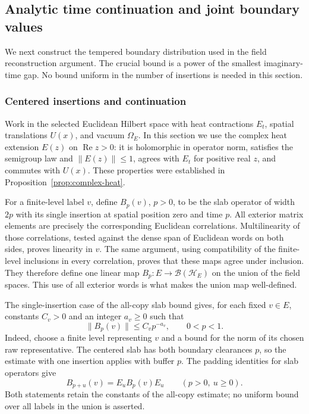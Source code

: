 \subsection{Analytic time continuation and joint boundary values}
\label{sec:analytic-boundary}
We next construct the tempered boundary distribution used in the field
reconstruction argument. The crucial bound is a power of the smallest imaginary-time
gap. No bound uniform in the number of insertions is needed in this section.

\subsubsection{Centered insertions and continuation}
Work in the selected Euclidean Hilbert space with heat contractions $E_t$,
spatial translations $U(x)$, and vacuum $\Omega_E$. In this section we use the
complex heat extension $E(z)$ on $\operatorname{Re}z>0$: it is holomorphic in
operator norm, satisfies the semigroup law and $\|E(z)\|\leq1$, agrees with
$E_t$ for positive real $z$, and commutes with $U(x)$. These properties were established in
Proposition~\ref{prop:complex-heat}.

For a finite-level label $v$, define $B_p(v)$, $p>0$, to be the slab operator
of width $2p$ with its single insertion at spatial position zero and time $p$.
All exterior matrix elements are precisely the corresponding Euclidean
correlations. Multilinearity of those correlations, tested against the dense
span of Euclidean words on both sides, proves linearity in $v$. The same
argument, using compatibility of the finite-level inclusions in every
correlation, proves that these maps agree under inclusion. They therefore
define one linear map $B_p:E\to\mathcal B(\mathcal H_E)$ on the union of the
field spaces. This use of all exterior words is what makes the union map
well-defined.

The single-insertion case of the all-copy slab bound gives, for each fixed
$v\in E$, constants $C_v>0$ and an integer $a_v\geq0$ such that
\begin{equation}\label{eq:bar-power}
 \|B_p(v)\|\leq C_vp^{-a_v},\qquad 0<p<1.
\end{equation}
Indeed, choose a finite level representing $v$ and a bound for the norm of its
chosen raw representative. The centered slab has both boundary clearances
$p$, so the estimate with one insertion applies with buffer $p$.
The padding identities for slab operators give
\begin{equation}\label{eq:bar-padding}
 B_{p+u}(v)=E_u B_p(v)E_u\qquad(p>0,\ u\geq0).
\end{equation}
Both statements retain the constants of the all-copy estimate; no uniform
bound over all labels in the union is asserted.

